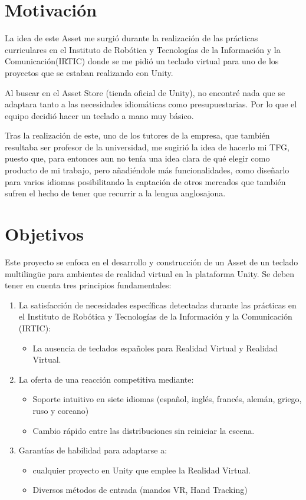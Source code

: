 \section{Motivación}
La idea de este Asset me surgió durante la realización de las prácticas curriculares en el Instituto de Robótica y Tecnologías de la Información y la Comunicación(IRTIC) donde se me pidió un teclado virtual para uno de los proyectos que se estaban realizando con Unity.

Al buscar en el Asset Store (tienda oficial de Unity), no encontré nada que se adaptara tanto a las necesidades idiomáticas como presupuestarias. Por lo que el equipo decidió hacer un teclado a mano muy básico.

Tras la realización de este, uno de los tutores de la empresa, que también resultaba ser profesor de la universidad, me sugirió la idea de hacerlo mi TFG, puesto que, para entonces aun no tenía una idea clara de qué elegir como producto de mi trabajo, pero añadiéndole más funcionalidades, como diseñarlo para varios idiomas posibilitando la captación de otros mercados que también sufren el hecho de tener que recurrir a la lengua anglosajona.

\section{Objetivos}

Este proyecto se enfoca en el desarrollo y construcción de un Asset de un teclado multilingüe para ambientes de realidad virtual en la plataforma Unity. Se deben tener en cuenta tres principios fundamentales:

\begin{enumerate}
	\item La satisfacción de necesidades específicas detectadas durante las prácticas en el Instituto de Robótica y Tecnologías de la Información y la Comunicación (IRTIC):
	\begin{itemize}
		\item La ausencia de teclados españoles para Realidad Virtual y Realidad Virtual.
	\end{itemize}

	\item La oferta de una reacción competitiva mediante:
	\begin{itemize}
		\item Soporte intuitivo en siete idiomas (español, inglés, francés, alemán, griego, ruso
		y coreano)

		\item Cambio rápido entre las distribuciones sin reiniciar la escena.
	\end{itemize}
	\item Garantías de habilidad para adaptarse a:
	
	\begin{itemize}
		\item cualquier proyecto en Unity que emplee la Realidad Virtual.
		\item Diversos métodos de entrada (mandos VR, Hand Tracking)
	\end{itemize}
\end{enumerate}



